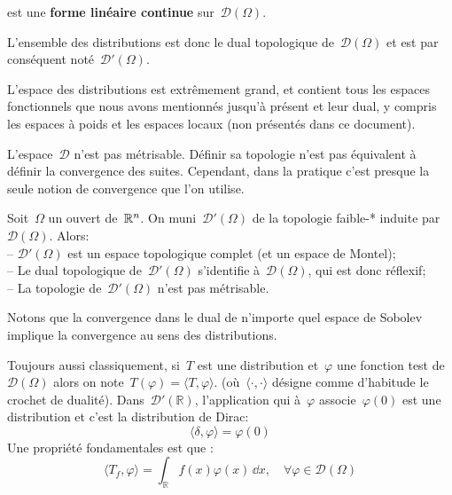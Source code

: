 \medskip
\begin{definition}[Distribution]
 est une \textbf{forme linéaire continue} sur~$\mathcal{D}(\Omega)$.
\end{definition}

L'ensemble des distributions est donc le dual topologique de~$\mathcal{D}(\Omega)$ et est par conséquent noté~$\mathcal{D}'(\Omega)$.

\begin{remarque}
L'espace des distributions est extrêmement grand, et contient tous les espaces fonctionnels que nous avons mentionnés jusqu'à présent et leur dual, y compris les espaces à poids et les espaces locaux (non présentés dans ce document).
\end{remarque}
\begin{remarque}
L'espace~$\mathcal{D}$ n'est pas métrisable. Définir sa topologie n'est pas équivalent à définir la convergence des suites. Cependant, dans la pratique c'est presque la seule notion de convergence que l'on utilise.

\medskip\noindent
Soit~$\Omega$ un ouvert de~$\mathbb R^n$. On muni~$\mathcal{D}'(\Omega)$ de la topologie faible-* induite par~$\mathcal{D}(\Omega)$. Alors:\\
-- $\mathcal{D}'(\Omega)$ est un espace topologique complet (et un espace de Montel);\\
-- Le dual topologique de~$\mathcal{D}'(\Omega)$ s'identifie à~$\mathcal{D}(\Omega)$, qui est donc réflexif;\\
-- La topologie de~$\mathcal{D}'(\Omega)$ n'est pas métrisable.

\medskip
Notons que la convergence dans le dual de n'importe quel espace de Sobolev implique la convergence au sens des distributions.
\end{remarque}

Toujours aussi classiquement, si~$T$ est une distribution et~$\varphi$ une fonction test de $\mathcal{D}(\Omega)$ alors on note~$T(\varphi)=\langle T,\varphi \rangle$. (où~$\langle\cdot,\cdot\rangle$ désigne comme d'habitude le crochet de dualité).
\medskipvm
Dans~$\mathcal{D}'(\mathbb{R})$, l'application qui à~$\varphi$ associe~$\varphi(0)$ est une distribution et c'est la distribution de Dirac:
\begin{equation}
\langle\delta,\varphi\rangle=\varphi(0)
\end{equation}
\medskipvm
Une propriété fondamentales est que :
\begin{equation}
  \langle T_f,\varphi\rangle=\int_{\mathbb{R}}f(x)\varphi(x)\,\dd x, \quad \forall \varphi\in\mathcal{D}(\Omega)
\end{equation}


